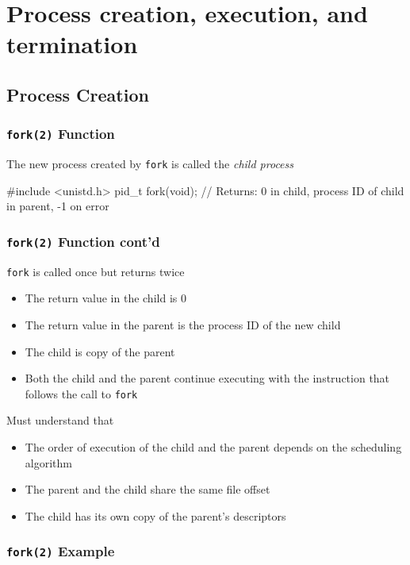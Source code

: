 \documentclass[newPxFont,sthlmFooter,nooffset]{beamer}
\begin{document}
\section{Process creation, execution, and termination}

\subsection{Process Creation}
\begin{frame}[containsverbatim,t]
  \frametitle{\texttt{fork(2)} Function}

The new process created by \texttt{fork} is called the \textit{child process}

\begin{codedef}
#include <unistd.h>
pid_t fork(void);
// Returns: 0 in child, process ID of child in parent, -1 on error
\end{codedef}
\end{frame}

\begin{frame}[t]
  \frametitle{\texttt{fork(2)} Function cont'd}
\texttt{fork} is called once but returns twice
\begin{itemize}
\item The return value in the child is 0
\item The return value in the parent is the process ID of the new child
\item The child is copy of the parent
\item Both the child and the parent continue executing with the instruction that follows the call to \texttt{fork}
\end{itemize}

Must understand that
\begin{itemize}
\item The order of execution of the child and the parent depends on the scheduling algorithm
\item The parent and the child share the same file offset
\item The child has its own copy of the parent's descriptors
\end{itemize}
\end{frame}


\begin{frame}[containsverbatim,t]
  \frametitle{\texttt{fork(2)} Example}


\end{frame}
\end{document}
